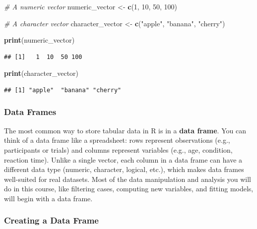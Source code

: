 \documentclass[
  11pt,
]{article}
\newenvironment{Shaded}{\begin{snugshade}}{\end{snugshade}}
\newcommand{\CommentTok}[1]{\textcolor[rgb]{0.56,0.35,0.01}{\textit{#1}}}
\newcommand{\DecValTok}[1]{\textcolor[rgb]{0.00,0.00,0.81}{#1}}
\newcommand{\FunctionTok}[1]{\textcolor[rgb]{0.13,0.29,0.53}{\textbf{#1}}}
\newcommand{\NormalTok}[1]{#1}
\newcommand{\OtherTok}[1]{\textcolor[rgb]{0.56,0.35,0.01}{#1}}
\newcommand{\StringTok}[1]{\textcolor[rgb]{0.31,0.60,0.02}{#1}}
\begin{document}
\begin{Shaded}
\begin{Highlighting}[]
\CommentTok{\# A numeric vector}
\NormalTok{numeric\_vector }\OtherTok{\textless{}{-}} \FunctionTok{c}\NormalTok{(}\DecValTok{1}\NormalTok{, }\DecValTok{10}\NormalTok{, }\DecValTok{50}\NormalTok{, }\DecValTok{100}\NormalTok{)}

\CommentTok{\# A character vector}
\NormalTok{character\_vector }\OtherTok{\textless{}{-}} \FunctionTok{c}\NormalTok{(}\StringTok{"apple"}\NormalTok{, }\StringTok{"banana"}\NormalTok{, }\StringTok{"cherry"}\NormalTok{)}

\FunctionTok{print}\NormalTok{(numeric\_vector)}
\end{Highlighting}
\end{Shaded}

\begin{verbatim}
## [1]   1  10  50 100
\end{verbatim}

\begin{Shaded}
\begin{Highlighting}[]
\FunctionTok{print}\NormalTok{(character\_vector)}
\end{Highlighting}
\end{Shaded}

\begin{verbatim}
## [1] "apple"  "banana" "cherry"
\end{verbatim}

\subsubsection{Data Frames}\label{data-frames}

The most common way to store tabular data in R is in a \textbf{data
frame}. You can think of a data frame like a spreadsheet: rows represent
observations (e.g., participants or trials) and columns represent
variables (e.g., age, condition, reaction time). Unlike a single vector,
each column in a data frame can have a different data type (numeric,
character, logical, etc.), which makes data frames well-suited for real
datasets. Most of the data manipulation and analysis you will do in this
course, like filtering cases, computing new variables, and fitting
models, will begin with a data frame.

\subsubsection{Creating a Data Frame}\label{creating-a-data-frame}
\end{document}
